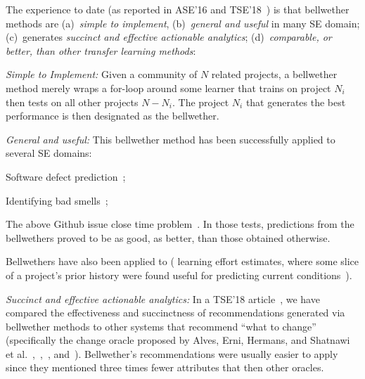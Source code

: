 The experience to date (as reported in ASE'16 and TSE'18~\cite{KrishnaMF16,krishna2018bellwethers}) is that 
bellwether methods are (a)~{\em simple to implement},
(b)~{\em general and useful} in many SE domain;
 (c)~generates {\em succinct and  effective actionable analytics};
(d)~{\em comparable, or better,
than   other 
transfer learning methods}:
\bi
\item[a.]
{\em Simple to Implement:} Given a community
of $N$ related projects, a bellwether method 
merely wraps a for-loop around some learner that
trains on project $N_i$ then tests on all other projects $N-N_i$. The project $N_i$ that generates the best performance is then designated as the bellwether. 
\item[b.] {\em General and useful:} 
This bellwether method has been successfully applied to several SE domains:
\bi
\item Software defect prediction~\cite{krishna2018bellwethers};
\item Identifying bad smells~\cite{krishna2018bellwethers}; 
\item The above Github issue close time problem~\cite{KrishnaMF16,krishna2018bellwethers}. In those tests,  predictions from the bellwethers proved to be as good, as better, than those obtained otherwise.
\item 
Bellwethers have also been   applied  to ( learning effort estimates, where  some slice of a project's prior history were found  useful for predicting  current conditions~\cite{mensah2017investigating,mensah2017stratification,mensah18z}).
\ei
{}
\item [c.] {\em  Succinct and effective actionable analytics:}
In a TSE'18 article~\cite{krishna2018bellwethers},
we have compared the effectiveness and succinctness of recommendations generated via bellwether methods
to other systems that recommend
 ``what to change''
 (specifically the change
oracle proposed by  Alves, Erni, Hermans, and Shatnawi et al.~\cite{Al10},~\cite{Er96},~\cite{He15}, and~\cite{Sh10}).
Bellwether's recommendations were usually easier to apply since  they mentioned three times fewer
attributes that then other oracles. 
